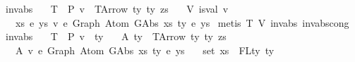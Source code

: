 \begin{isabellebody}
\isanewline
{}\isamarkupfalse%
%
\endisatagproof
{\isafoldproof}%
%
\isadelimproof
\isanewline
%
\endisadelimproof
\isanewline
\isanewline
{}\isamarkupfalse%
\ inv{\isacharunderscore}{\kern0pt}abs{}{\isacharcolon}{\kern0pt}\isanewline
\ \ \ T{\isacharcolon}{\kern0pt}\ {\isachardoublequoteopen}{\isacharbrackleft}{\kern0pt}{\isacharbrackright}{\kern0pt}\ {\isasymturnstile}{\isacharbraceleft}{\kern0pt}P{\isacharbraceright}{\kern0pt}\ v\ {\isacharcolon}{\kern0pt}\ TArrow\ ty{}\ ty{}\ zs{\isachardoublequoteclose}\isanewline
\ \ \ V{\isacharcolon}{\kern0pt}\ {\isachardoublequoteopen}is{\isacharunderscore}{\kern0pt}val\ v{\isachardoublequoteclose}\isanewline
\ \ \ {\isachardoublequoteopen}{\isasymexists}xs\ e{\isacharprime}{\kern0pt}\ ys{\isachardot}{\kern0pt}\ v\ {\isasymsimeq}e\ Graph\ {\isacharparenleft}{\kern0pt}Atom\ {\isacharparenleft}{\kern0pt}GAbs\ xs\ ty{}\ e{\isacharprime}{\kern0pt}{\isacharparenright}{\kern0pt}\ ys{\isacharparenright}{\kern0pt}{\isachardoublequoteclose}\isanewline
%
\isadelimproof
%
\endisadelimproof
%
\isatagproof
{}\isamarkupfalse%
\ {\isacharparenleft}{\kern0pt}metis\ T\ V\ inv{\isacharunderscore}{\kern0pt}abs{}\ inv{\isacharunderscore}{\kern0pt}abs{\isacharunderscore}{\kern0pt}cong{}{\isacharparenright}{\kern0pt}%
\endisatagproof
{\isafoldproof}%
%
\isadelimproof
\isanewline
%
\endisadelimproof
\isanewline
\isanewline
{}\isamarkupfalse%
\ inv{\isacharunderscore}{\kern0pt}abs{}{\isacharcolon}{\kern0pt}\isanewline
\ \ \ T{\isacharcolon}{\kern0pt}\ {\isachardoublequoteopen}{\isasymGamma}\ {\isasymturnstile}{\isacharbraceleft}{\kern0pt}P{\isacharbraceright}{\kern0pt}\ v\ {\isacharcolon}{\kern0pt}\ ty{\isachardoublequoteclose}\isanewline
\ \ \ A{}{\isacharcolon}{\kern0pt}\ {\isachardoublequoteopen}ty\ {\isacharequal}{\kern0pt}\ TArrow\ ty{}\ ty{}\ zs{\isachardoublequoteclose}\isanewline
\ \ \ A{}{\isacharcolon}{\kern0pt}\ {\isachardoublequoteopen}v\ {\isasymsimeq}e\ Graph\ {\isacharparenleft}{\kern0pt}Atom\ {\isacharparenleft}{\kern0pt}GAbs\ xs\ ty{}{\isacharprime}{\kern0pt}\ e{\isacharprime}{\kern0pt}{\isacharparenright}{\kern0pt}\ ys{\isacharparenright}{\kern0pt}{\isachardoublequoteclose}\isanewline
\ \ \ {\isachardoublequoteopen}set\ xs\ {\isacharequal}{\kern0pt}\ FLty\ ty{}{\isacharprime}{\kern0pt}{\isachardoublequoteclose}\isanewline

\end{isabellebody}
